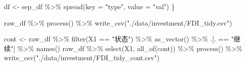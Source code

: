 \documentclass[
]{ctexart}
\newenvironment{Shaded}{\begin{snugshade}}{\end{snugshade}}
\newcommand{\AttributeTok}[1]{\textcolor[rgb]{0.77,0.63,0.00}{#1}}
\newcommand{\FunctionTok}[1]{\textcolor[rgb]{0.00,0.00,0.00}{#1}}
\newcommand{\NormalTok}[1]{#1}
\newcommand{\OtherTok}[1]{\textcolor[rgb]{0.56,0.35,0.01}{#1}}
\newcommand{\SpecialCharTok}[1]{\textcolor[rgb]{0.00,0.00,0.00}{#1}}
\newcommand{\StringTok}[1]{\textcolor[rgb]{0.31,0.60,0.02}{#1}}
\begin{document}
\begin{Shaded}
\begin{Highlighting}[]
\NormalTok{  df }\OtherTok{\textless{}{-}}\NormalTok{ sep\_df }\SpecialCharTok{\%\textgreater{}\%} \FunctionTok{spread}\NormalTok{(}\AttributeTok{key =} \StringTok{"type"}\NormalTok{, }\AttributeTok{value =} \StringTok{"val"}\NormalTok{)}
\NormalTok{\}}

\NormalTok{raw\_df }\SpecialCharTok{\%\textgreater{}\%}
  \FunctionTok{process}\NormalTok{() }\SpecialCharTok{\%\textgreater{}\%}
  \FunctionTok{write\_csv}\NormalTok{(}\StringTok{"./data/investment/FDI\_tidy.csv"}\NormalTok{)}

\NormalTok{cont }\OtherTok{\textless{}{-}}\NormalTok{ raw\_df }\SpecialCharTok{\%\textgreater{}\%}
  \FunctionTok{filter}\NormalTok{(X1 }\SpecialCharTok{==} \StringTok{"状态"}\NormalTok{) }\SpecialCharTok{\%\textgreater{}\%}
  \FunctionTok{as\_vector}\NormalTok{() }\SpecialCharTok{\%\textgreater{}\%}
\NormalTok{  .[. }\SpecialCharTok{==} \StringTok{"继续"}\NormalTok{] }\SpecialCharTok{\%\textgreater{}\%}
  \FunctionTok{names}\NormalTok{()}
\NormalTok{raw\_df }\SpecialCharTok{\%\textgreater{}\%}
  \FunctionTok{select}\NormalTok{(X1, }\FunctionTok{all\_of}\NormalTok{(cont)) }\SpecialCharTok{\%\textgreater{}\%}
  \FunctionTok{process}\NormalTok{() }\SpecialCharTok{\%\textgreater{}\%}
  \FunctionTok{write\_csv}\NormalTok{(}\StringTok{"./data/investment/FDI\_tidy\_cont.csv"}\NormalTok{)}
\end{Highlighting}
\end{Shaded}
\end{document}

